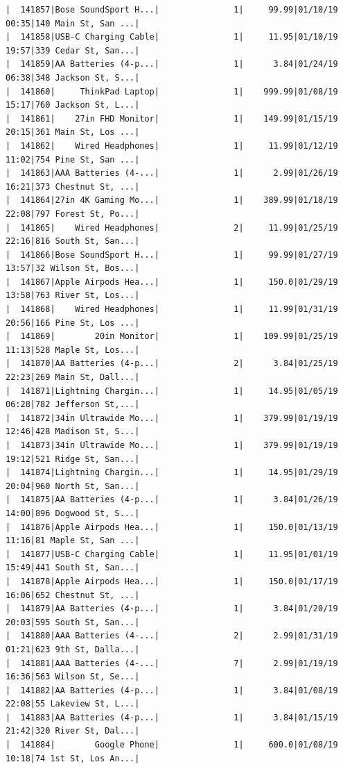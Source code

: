 \documentclass[
  letterpaper,
  DIV=11,
  numbers=noendperiod]{scrartcl}
\begin{document}
\begin{verbatim}
|  141857|Bose SoundSport H...|               1|     99.99|01/10/19 00:35|140 Main St, San ...|
|  141858|USB-C Charging Cable|               1|     11.95|01/10/19 19:57|339 Cedar St, San...|
|  141859|AA Batteries (4-p...|               1|      3.84|01/24/19 06:38|348 Jackson St, S...|
|  141860|     ThinkPad Laptop|               1|    999.99|01/08/19 15:17|760 Jackson St, L...|
|  141861|    27in FHD Monitor|               1|    149.99|01/15/19 20:15|361 Main St, Los ...|
|  141862|    Wired Headphones|               1|     11.99|01/12/19 11:02|754 Pine St, San ...|
|  141863|AAA Batteries (4-...|               1|      2.99|01/26/19 16:21|373 Chestnut St, ...|
|  141864|27in 4K Gaming Mo...|               1|    389.99|01/18/19 22:08|797 Forest St, Po...|
|  141865|    Wired Headphones|               2|     11.99|01/25/19 22:16|816 South St, San...|
|  141866|Bose SoundSport H...|               1|     99.99|01/27/19 13:57|32 Wilson St, Bos...|
|  141867|Apple Airpods Hea...|               1|     150.0|01/29/19 13:58|763 River St, Los...|
|  141868|    Wired Headphones|               1|     11.99|01/31/19 20:56|166 Pine St, Los ...|
|  141869|        20in Monitor|               1|    109.99|01/25/19 11:13|528 Maple St, Los...|
|  141870|AA Batteries (4-p...|               2|      3.84|01/25/19 22:23|269 Main St, Dall...|
|  141871|Lightning Chargin...|               1|     14.95|01/05/19 06:28|782 Jefferson St,...|
|  141872|34in Ultrawide Mo...|               1|    379.99|01/19/19 12:46|428 Madison St, S...|
|  141873|34in Ultrawide Mo...|               1|    379.99|01/19/19 19:12|521 Ridge St, San...|
|  141874|Lightning Chargin...|               1|     14.95|01/29/19 20:04|960 North St, San...|
|  141875|AA Batteries (4-p...|               1|      3.84|01/26/19 14:00|896 Dogwood St, S...|
|  141876|Apple Airpods Hea...|               1|     150.0|01/13/19 11:16|81 Maple St, San ...|
|  141877|USB-C Charging Cable|               1|     11.95|01/01/19 15:49|441 South St, San...|
|  141878|Apple Airpods Hea...|               1|     150.0|01/17/19 16:06|652 Chestnut St, ...|
|  141879|AA Batteries (4-p...|               1|      3.84|01/20/19 20:03|595 South St, San...|
|  141880|AAA Batteries (4-...|               2|      2.99|01/31/19 01:21|623 9th St, Dalla...|
|  141881|AAA Batteries (4-...|               7|      2.99|01/19/19 16:36|563 Wilson St, Se...|
|  141882|AA Batteries (4-p...|               1|      3.84|01/08/19 22:08|55 Lakeview St, L...|
|  141883|AA Batteries (4-p...|               1|      3.84|01/15/19 21:42|320 River St, Dal...|
|  141884|        Google Phone|               1|     600.0|01/08/19 10:18|74 1st St, Los An...|

\end{verbatim}
\end{document}
